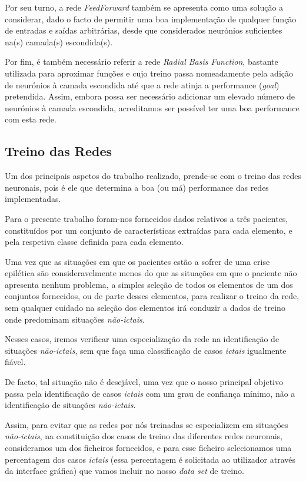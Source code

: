 \documentclass{article}
\begin{document}
Por seu turno, a rede \emph{FeedForward} também se apresenta como uma solução a considerar, dado o facto de permitir uma boa implementação de qualquer função de entradas e saídas arbitrárias, desde que considerados neurónios suficientes na(s) camada(s) escondida(s).

Por fim, é também necessário referir a rede \emph{Radial Basis Function}, bastante utilizada para aproximar funções e cujo treino passa nomeadamente pela adição de neurónios à camada escondida até que a rede atinja a performance (\emph{goal}) pretendida. Assim, embora possa ser necessário adicionar um elevado número de neurónios à camada escondida, acreditamos ser possível ter uma boa performance com esta rede.

\subsection{Treino das Redes}

Um dos principais aspetos do trabalho realizado, prende-se com o treino das redes neuronais, pois é ele que determina a boa (ou má) performance das redes implementadas.

Para o presente trabalho foram-nos fornecidos dados relativos a três pacientes, constituídos por um conjunto de características extraídas para cada elemento, e pela respetiva classe definida para cada elemento.

Uma vez que as situações em que os pacientes estão a sofrer de uma crise epilética são consideravelmente menos do que as situações em que o paciente não apresenta nenhum problema, a simples seleção de todos os elementos de um dos conjuntos fornecidos, ou de parte desses elementos, para realizar o treino da rede, sem qualquer cuidado na seleção dos elementos irá conduzir a dados de treino onde predominam situações \emph{não-ictais}.

Nesses casos, iremos verificar uma especialização da rede na identificação de situações \emph{não-ictais}, sem que faça uma classificação de casos \emph{ictais} igualmente fiável.

De facto, tal situação não é desejável, uma vez que o nosso principal objetivo passa pela identificação de casos \emph{ictais} com um grau de confiança mínimo, não a identificação de situações \emph{não-ictais}.

Assim, para evitar que as redes por nós treinadas se especializem em situações \emph{não-ictais}, na constituição dos casos de treino das diferentes redes neuronais, consideramos um dos ficheiros fornecidos, e para esse ficheiro selecionamos uma percentagem dos casos \emph{ictais} (essa percentagem é solicitada ao utilizador através da interface gráfica) que vamos incluir no nosso \emph{data set} de treino.
\end{document}
